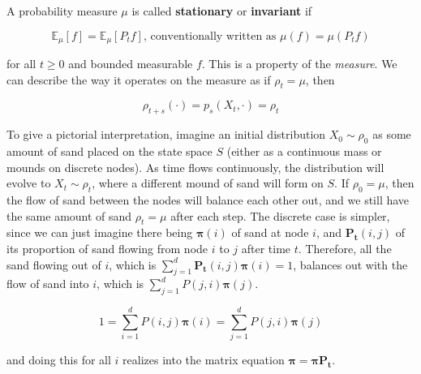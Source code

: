 \documentclass{article}
\begin{document}
    \begin{definition}
      A probability measure $\mu$ is called \textbf{stationary} or \textbf{invariant} if 

        \[\mathbb{E}_\mu[f] = \mathbb{E}_\mu [P_t f] \text{, conventionally written as } \mu(f) = \mu(P_t f)\]

      for all $t \geq 0$ and bounded measurable $f$. This is a property of the \textit{measure}. We can describe the way it operates on the measure as if $\rho_t = \mu$, then 

        \[\rho_{t + s} (\cdot) = p_s (X_t, \cdot) = \rho_t\]
    \end{definition}

    To give a pictorial interpretation, imagine an initial distribution $X_0 \sim \rho_0$ as some amount of sand placed on the state space $S$ (either as a continuous mass or mounds on discrete nodes). As time flows continuously, the distribution will evolve to $X_t \sim \rho_t$, where a different mound of sand will form on $S$. If $\rho_0 = \mu$, then the flow of sand between the nodes will balance each other out, and we still have the same amount of sand $\rho_t = \mu$ after each step. The discrete case is simpler, since we can just imagine there being $\boldsymbol{\pi} (i)$ of sand at node $i$, and $\mathbf{P_t} (i, j)$ of its proportion of sand flowing from node $i$ to $j$ after time $t$. Therefore, all the sand flowing out of $i$, which is $\sum_{j=1}^d \mathbf{P_t} (i, j) \boldsymbol{\pi}(i) = 1$, balances out with the flow of sand into $i$, which is $\sum_{j=1}^d P(j, i) \boldsymbol{\pi}(j)$. 

      \[1 = \sum_{i=1}^d P(i, j) \boldsymbol{\pi}(i) = \sum_{j=1}^d P(j, i) \boldsymbol{\pi}(j)\]

    and doing this for all $i$ realizes into the matrix equation $\boldsymbol{\pi} = \boldsymbol{\pi} \mathbf{P_t}$. 
\end{document}
